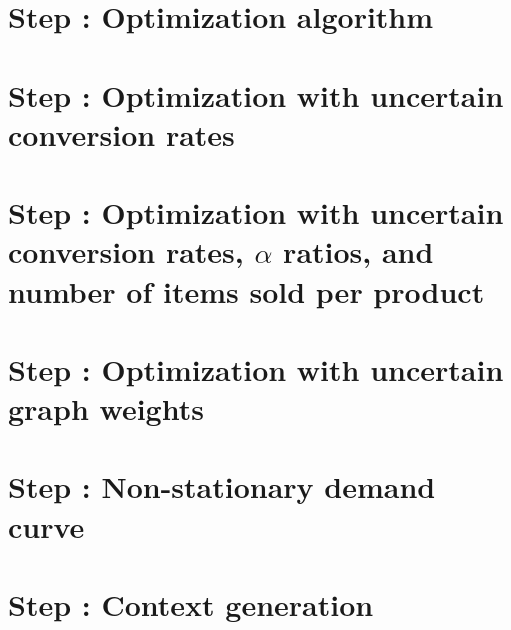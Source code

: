 \documentclass{article}
\begin{document}
\newpage
\section{Step : Optimization algorithm}


\newpage
\section{Step : Optimization with uncertain conversion rates}


\newpage
\section{Step : Optimization with uncertain conversion rates, $\alpha$ ratios, and number of items sold per product}

\newpage
\section{Step : Optimization with uncertain graph weights}

\newpage
\section{Step : Non-stationary demand curve}

\newpage
\section{Step : Context generation}
\end{document}
